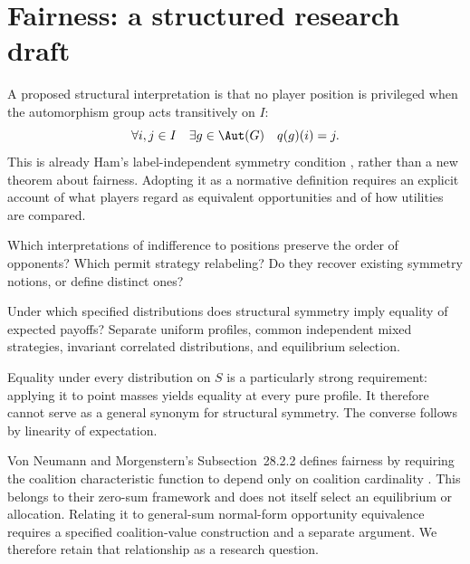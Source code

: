 \section{Fairness: a structured research draft}
A proposed structural interpretation is that no player position is privileged
when the automorphism group acts transitively on $I$:
\[
 \forall i,j\in I\quad\exists g\in\Aut(G)\quad q(g)(i)=j.
\]
This is already Ham's label-independent symmetry condition
\citep[Definition~5.4]{ham2021}, rather than a new theorem about fairness.
Adopting it as a normative definition requires an explicit account of what
players regard as equivalent opportunities and of how utilities are compared.

\begin{question}
Which interpretations of indifference to positions preserve the order of
opponents? Which permit strategy relabeling? Do they recover existing
symmetry notions, or define distinct ones?
\end{question}
\begin{question}
Under which specified distributions does structural symmetry imply equality
of expected payoffs? Separate uniform profiles, common independent mixed
strategies, invariant correlated distributions, and equilibrium selection.
\end{question}
Equality under every distribution on $S$ is a particularly strong requirement:
applying it to point masses yields equality at every pure profile. It therefore
cannot serve as a general synonym for structural symmetry.
The converse follows by linearity of expectation.


Von Neumann and Morgenstern's Subsection~28.2.2 defines fairness by requiring
the coalition characteristic function to depend only on coalition cardinality
\citep{vnm1953}. This belongs to their zero-sum framework and does not itself
select an equilibrium or allocation. Relating it to general-sum normal-form
opportunity equivalence requires a specified coalition-value construction
and a separate argument. We therefore retain that relationship as a research
question.
